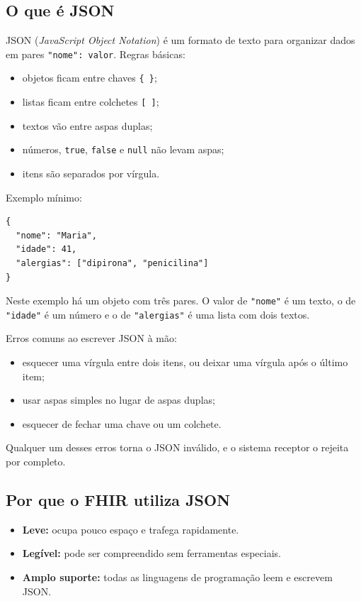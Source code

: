 \documentclass[11pt,a4paper]{article}
\newcommand{\codigo}[1]{\texttt{#1}}
\begin{document}
\subsection{O que é JSON}

JSON (\emph{JavaScript Object Notation}) é um formato de texto para
organizar dados em pares \codigo{"nome": valor}. Regras básicas:

\begin{itemize}
  \item objetos ficam entre chaves \codigo{\{ \}};
  \item listas ficam entre colchetes \codigo{[ ]};
  \item textos vão entre aspas duplas;
  \item números, \codigo{true}, \codigo{false} e \codigo{null} não levam
    aspas;
  \item itens são separados por vírgula.
\end{itemize}

Exemplo mínimo:

\begin{Verbatim}[frame=single,fontsize=\footnotesize]
{
  "nome": "Maria",
  "idade": 41,
  "alergias": ["dipirona", "penicilina"]
}
\end{Verbatim}

Neste exemplo há um objeto com três pares. O valor de \codigo{"nome"} é um
texto, o de \codigo{"idade"} é um número e o de \codigo{"alergias"} é uma
lista com dois textos.

Erros comuns ao escrever JSON à mão:

\begin{itemize}
  \item esquecer uma vírgula entre dois itens, ou deixar uma vírgula após
    o último item;
  \item usar aspas simples no lugar de aspas duplas;
  \item esquecer de fechar uma chave ou um colchete.
\end{itemize}

Qualquer um desses erros torna o JSON inválido, e o sistema receptor o
rejeita por completo.

\subsection{Por que o FHIR utiliza JSON}

\begin{itemize}
  \item \textbf{Leve:} ocupa pouco espaço e trafega rapidamente.
  \item \textbf{Legível:} pode ser compreendido sem ferramentas
    especiais.
  \item \textbf{Amplo suporte:} todas as linguagens de programação
    leem e escrevem JSON.
\end{itemize}
\end{document}
